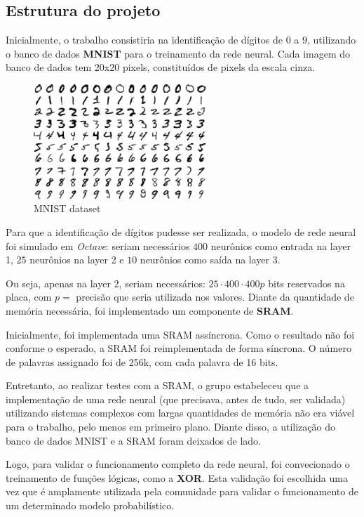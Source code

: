     \subsection{Estrutura do projeto}

    Inicialmente, o trabalho consistiria na identificação de dígitos de $0$ a $9$, utilizando o banco de dados \textbf{MNIST} para o treinamento da rede neural. Cada imagem do banco de dados tem $20$x$20$ pixels, constituídos de pixels da escala cinza.

    \begin{figure}[ht!]
      \centering
      \includegraphics[width=6.5cm]{figures/mnistdigits}
      \caption{MNIST dataset}
      \label{fig:arch}
    \end{figure}

    Para que a identificação de dígitos pudesse ser realizada, o modelo de rede neural foi simulado em \textit{Octave}: seriam necessários $400$ neurônios como entrada na layer 1, $25$ neurônios na layer 2 e $10$ neurônios como saída na layer 3. 

    Ou seja, apenas na layer 2, seriam necessários: $25 \cdot 400 \cdot 400p$ bits reservados na placa, com $p =$ precisão que seria utilizada nos valores. Diante da quantidade de memória necessária, foi implementado um componente de \textbf{SRAM}.

    Inicialmente, foi implementada uma SRAM assíncrona. Como o resultado não foi conforme o esperado, a SRAM foi reimplementada de forma síncrona. O número de palavras assignado foi de 256k, com cada palavra de 16 bits.

    Entretanto, ao realizar testes com a SRAM, o grupo estabeleceu que a implementação de uma rede neural (que precisava, antes de tudo, ser validada) utilizando sistemas complexos com largas quantidades de memória não era viável para o trabalho, pelo menos em primeiro plano. Diante disso, a utilização do banco de dados MNIST e a SRAM foram deixados de lado. 

    Logo, para validar o funcionamento completo da rede neural, foi convecionado o treinamento de funções lógicas, como a \textbf{XOR}. Esta validação foi escolhida uma vez que é amplamente utilizada pela comunidade para validar o funcionamento de um determinado modelo probabilístico.

